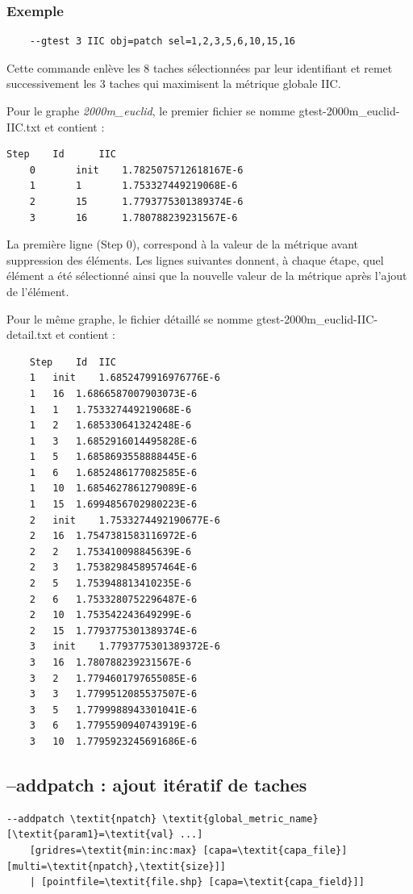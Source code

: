 \documentclass[a4paper,10pt]{report}
\begin{document}
\subsubsection{Exemple}

\begin{Verbatim}
	--gtest 3 IIC obj=patch sel=1,2,3,5,6,10,15,16
\end{Verbatim}

Cette commande enlève les 8 taches sélectionnées par leur identifiant et remet successivement les 3 taches qui maximisent la métrique globale IIC.

Pour le graphe \textit{2000m\_euclid}, le premier fichier se nomme gtest-2000m\_euclid-IIC.txt et contient :
\begin{Verbatim}[tabsize=4]
	Step	Id		IIC
	0		init	1.7825075712618167E-6
	1		1		1.753327449219068E-6
	2		15		1.7793775301389374E-6
	3		16		1.780788239231567E-6
\end{Verbatim}
La première ligne (Step 0), correspond à la valeur de la métrique avant suppression des éléments. Les lignes suivantes donnent, à chaque étape, quel élément a été sélectionné ainsi que la nouvelle valeur de la métrique après l'ajout de l'élément.

Pour le même graphe, le fichier détaillé se nomme gtest-2000m\_euclid-IIC-detail.txt et contient :
\begin{Verbatim}
	Step	Id	IIC
	1	init	1.6852479916976776E-6
	1	16	1.6866587007903073E-6
	1	1	1.753327449219068E-6
	1	2	1.685330641324248E-6
	1	3	1.6852916014495828E-6
	1	5	1.6858693558888445E-6
	1	6	1.6852486177082585E-6
	1	10	1.6854627861279089E-6
	1	15	1.6994856702980223E-6
	2	init	1.7533274492190677E-6
	2	16	1.7547381583116972E-6
	2	2	1.753410098845639E-6
	2	3	1.7538298458957464E-6
	2	5	1.753948813410235E-6
	2	6	1.7533280752296487E-6
	2	10	1.753542243649299E-6
	2	15	1.7793775301389374E-6
	3	init	1.7793775301389372E-6
	3	16	1.780788239231567E-6
	3	2	1.7794601797655085E-6
	3	3	1.7799512085537507E-6
	3	5	1.7799988943301041E-6
	3	6	1.7795590940743919E-6
	3	10	1.7795923245691686E-6
\end{Verbatim}


\subsection{--addpatch : ajout itératif de taches}
\begin{Verbatim}[commandchars=\\\{\}]
--addpatch \textit{npatch} \textit{global_metric_name} [\textit{param1}=\textit{val} ...]
	[gridres=\textit{min:inc:max} [capa=\textit{capa_file}] [multi=\textit{npatch},\textit{size}]]
	| [pointfile=\textit{file.shp} [capa=\textit{capa_field}]]
\end{Verbatim}
\end{document}
